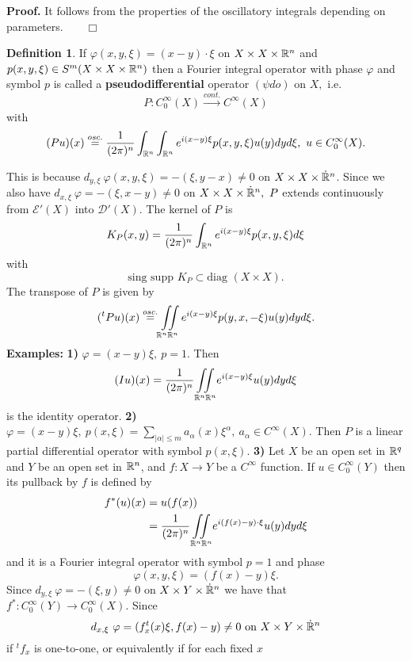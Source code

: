 \documentclass[12pt,reqno]{amsart}
\theoremstyle{plain}  %
\theoremstyle{definition}
\newtheorem{definition}{Definition}
\newcommand{\nin}{\noindent}
\newcommand{\vph}{\varphi}
\begin{document}
\nin
{\bf Proof.} It follows from the properties of the oscillatory
integrals depending on parameters.$ \qquad \Box$
\vskip0.2in
\begin{definition}  If $\vph(x,y,\xi)=(x-y) \cdot \xi$ on $X\times X \times
\Bbb R^n$ and $p(x,y,\xi) \in S^m(X \times X \times \Bbb R^n)$ then  a Fourier
integral operator with phase $\vph$ and symbol $p$ is called a
{\bf  pseudodifferential} operator $(\psi do)$ on $X, $ i.e. 
$$P: C^\infty_0(X) \xrightarrow{ cont.}  C^\infty(X)$$
with
$$(Pu) (x) \overset{osc.}{=} \frac{1}{(2\pi)^n}\int_{\Bbb R^n} \int_{\Bbb R^n}
e^{i(x-y)\xi} p(x,y,\xi) u(y) dyd\xi,\ u\in
C^\infty_0(X).$$
\end{definition}
\nin
This is because $d_{y,\xi}\ \vph(x,y,\xi) = 
- (\xi,y-x)\ne 0$ on $X \times X \times \dot{\Bbb R}^n$.  
Since we also have $d_{x,\xi}\ \vph =- (\xi,x-y) \ne 0$ on $X \times X
\times \dot{\Bbb R}^n,\ P$ extends continuously from $\mathcal E'(X)$ into $\mathcal D'(X)$.
The kernel of $P$ is 
$$K_P(x,y) =  \frac{1}{(2\pi)^n}\int_{\Bbb R^n} e^{i(x-y)\xi} p(x,y,\xi)d\xi$$
with
$$\text{sing supp } K_P \subset \text{diag } (X \times X).$$
The transpose of $P$ is given by
$$({}^tPu)(x)\overset{osc.}{=} \iint\limits_{\Bbb R^n \Bbb R^n} e^{i(x-y)\xi}
p(y,x, -\xi)u(y) dyd\xi.$$
\medskip
\nin
{\bf Examples:}
\vskip0.1in
\nin
{\bf 1)} \quad   $\vph = (x-y)\xi, \ p=1$.  Then
 $$(Iu)(x) = \frac{1}{(2\pi)^n} \underset{\Bbb R^n \Bbb R^n}{\iint} e^{i(x-y)\xi}
u(y)dyd\xi$$
is the identity operator.
\vskip0.1in
\nin
{\bf 2)} \quad $\vph = (x-y)\xi, \ p(x,\xi) = \sum\limits_{|\alpha| \le m}
a_\alpha (x) \xi^\alpha,\  a_\alpha \in C^\infty(X).$
Then $P$ is a linear partial differential operator with symbol $p(x,\xi)$.
\vskip0.1in
\nin
{\bf 3)} \quad Let  $X$ be an open set in $\Bbb R^q$ and $Y$ be an open set in
$\Bbb R^n $, and $f: X \longrightarrow Y$ be a $C^\infty$ function. 
If $u \in C^\infty_0 (Y)$ then  its  pullback by $f$ is defined by
\begin{align*}
f^*(u)(x) &= u(f(x))\\
&= \frac{1}{(2\pi)^n} \underset{\Bbb R^n \Bbb R^n}{{\iint}} e^{i(f(x) -y) \cdot
\xi} u(y)dyd\xi
\end{align*}
and it is a Fourier integral operator with symbol $p=1$ and phase
$$\vph(x,y,\xi) = (f(x) - y)  \xi.$$
Since $d_{y,\xi} \ \vph =-(\xi, y)\ne 0$ on $X \times Y \times \dot{\Bbb
R}^n$
we have that $f^*: C^\infty_0 (Y)\longrightarrow  C^\infty_0(X)$.
Since  
$$d_{x,\xi} \ \vph = (f^t_x(x)\xi,f(x)-y)\ne 0\text{ on }X \times Y \times
\dot{\Bbb R}^n $$
if ${}^tf_x$ is one-to-one, or equivalently if for each fixed $x$ 
\end{document}
